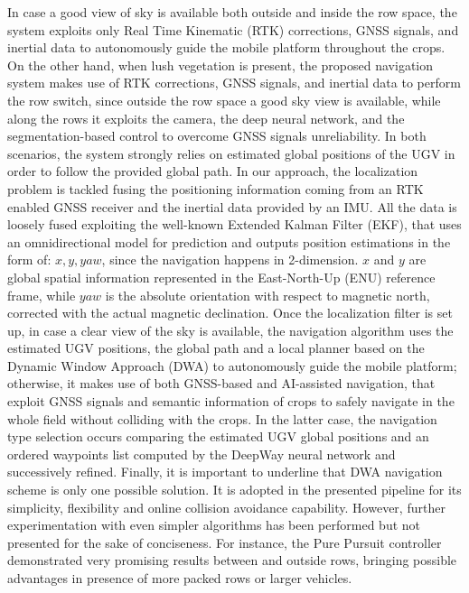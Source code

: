 \documentclass[journal]{IEEEtran}
\begin{document}
In case a good view of sky is available both outside and inside the row space, the system exploits only Real Time Kinematic (RTK) corrections, GNSS signals, and inertial data to autonomously guide the mobile platform throughout the crops. On the other hand, when lush vegetation is present, the proposed navigation system makes use of RTK corrections, GNSS signals, and inertial data to perform the row switch, since outside the row space a good sky view is available, while along the rows it exploits the camera, the deep neural network, and the segmentation-based control to overcome GNSS signals unreliability. 
In both scenarios, the system strongly relies on estimated global positions of the UGV in order to follow the provided global path. In our approach, the localization problem is tackled fusing the positioning information coming from an RTK enabled GNSS receiver and the inertial data provided by an IMU. All the data is loosely fused exploiting the well-known Extended Kalman Filter (EKF), that uses an omnidirectional model for prediction and outputs position estimations in the form of: $x, y, yaw$, since the navigation happens in 2-dimension. $x $ and $y$ are global spatial information represented in the East-North-Up (ENU) reference frame, while $yaw$ is the absolute orientation with respect to magnetic north, corrected with the actual magnetic declination.
Once the localization filter is set up, in case a clear view of the sky is available, the navigation algorithm uses the estimated UGV positions, the global path and a local planner based on the Dynamic Window Approach (DWA) to autonomously guide the mobile platform; otherwise, it makes use of both GNSS-based and AI-assisted navigation, that exploit GNSS signals and semantic information of crops to safely navigate in the whole field without colliding with the crops.
In the latter case, the navigation type selection occurs comparing the estimated UGV global positions and an ordered waypoints list computed by the DeepWay neural network and successively refined. Finally, it is important to underline that DWA navigation scheme is only one possible solution. It is adopted in the presented pipeline for its simplicity, flexibility and online collision avoidance capability. However, further experimentation with even simpler algorithms has been performed but not presented for the sake of conciseness. For instance, the Pure Pursuit controller \cite{coulter1992implementation} demonstrated very promising results between and outside rows, bringing possible advantages in presence of more packed rows or  larger vehicles.
\end{document}
